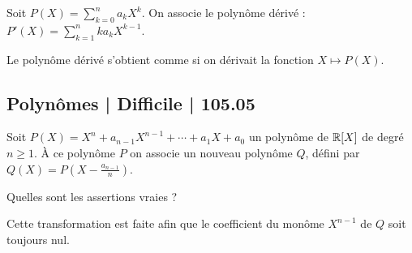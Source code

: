 \begin{question}

Soit $P(X) = \sum_{k=0}^n a_k X^k$. On associe le polynôme dérivé :
$P'(X) = \sum_{k=1}^n ka_k X^{k-1}$.
\begin{answers}



\end{answers}
\begin{explanations}
Le polynôme dérivé s'obtient comme si on dérivait la fonction $X \mapsto P(X)$. 
\end{explanations}
\end{question}


\subsection{Polynômes | Difficile | 105.05}


\begin{question}

Soit $P(X) = X^n + a_{n-1}X^{n-1} + \cdots + a_1X+a_0$ un polynôme de $\mathbb{R}[X]$ de degré $n \ge 1$. À ce polynôme $P$ on associe un nouveau polynôme $Q$, défini par $Q(X) = P(X - \frac{a_{n-1}}{n})$.

Quelles sont les assertions vraies ?
\begin{answers}



\end{answers}
\begin{explanations}
Cette transformation est faite afin que le coefficient du monôme $X^{n-1}$ de $Q$ soit toujours nul.
\end{explanations}
\end{question}


